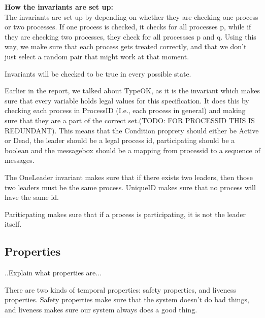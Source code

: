 \documentclass{report}
\begin{document}
\textbf{How the invariants are set up:}\\
The invariants are set up by depending on whether they are checking one process or two processes. If one process is checked, it checks for all processes p, while if they are checking two processes, they check for all processses p and q. Using this way, we make sure that each process gets treated correctly, and that we don't just select a random pair that might work at that moment.


Invariants will be checked to be true in every possible state.

Earlier in the report, we talked about TypeOK, as it is the invariant which makes sure that every variable holds legal values for this specification.
It does this by checking each process in ProcessID (I.e., each process in general) and making sure that they are a part of the correct set.(TODO: FOR PROCESSID THIS IS REDUNDANT). This means that the Condition proprety should either be Active or Dead, the leader should be a legal process id, participating should be a boolean and the messagebox should be a mapping from processid to a sequence of messages.

The OneLeader invariant makes sure that if there exists two leaders, then those two leaders must be the same process.
%
UniqueID makes sure that no process will have the same id.

Pariticpating makes sure that if a process is participating, it is not the leader itself.


\subsection{Properties}
..Explain what properties are...

There are two kinds of temporal properties: safety properties, and liveness properties. Safety properties make sure that the system doesn't do bad things, and liveness makes sure our system always does a good thing.\cite{https://learntla.com/core/temporal-logic.html}


\noindent{}
\end{document}
